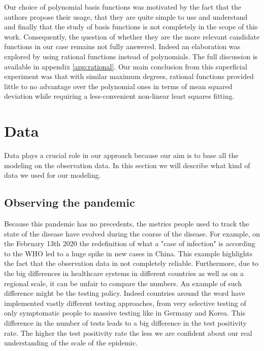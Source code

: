 \documentclass[12pt, letterpaper]{article}
\begin{document}
Our choice of polynomial basis functions was motivated by the fact that the authors propose their usage, that they are quite simple to use and understand and finally that the study of basis functions is not completely in the scope of this work. 
Consequently, the question of whether they are the more relevant candidate functions in our case remains not fully answered. 
Indeed an elaboration was explored by using rational functions instead of polynomials. 
The full discussion is available in appendix \ref{app:rational}.
Our main conclusion from this superficial experiment was that with similar maximum degrees, rational functions provided little to no advantage over the polynomial ones in terms of mean squared deviation while requiring a less-convenient non-linear least squares fitting.



\section{Data}\label{sec:data}

Data plays a crucial role in our approach because our aim is to base all the modeling on the observation data.
In this section we will describe what kind of data we used for our modeling.

\subsection{Observing the pandemic}\label{sec:jhu}

Because this pandemic has no precedents, the metrics people used to track the state of the disease have evolved during the course of the disease. 
For example, on the February 13th 2020 the redefinition of what a "case of infection" is according to the WHO led to a huge spike in new cases in China. 
This example highlights the fact that the observation data in not completely reliable. 
Furthermore, due to the big differences in healthcare systems in different countries as well as on a regional scale, it can be unfair to compare the numbers. 
An example of such difference might be the testing policy. 
Indeed countries around the word have implemented vastly different testing approaches, from very selective testing of only symptomatic people to massive testing like in Germany and Korea. 
This difference in the number of tests leads to a big difference in the test positivity rate. The higher the test positivity rate the less we are confident about our real understanding of the scale of the epidemic.
\end{document}
